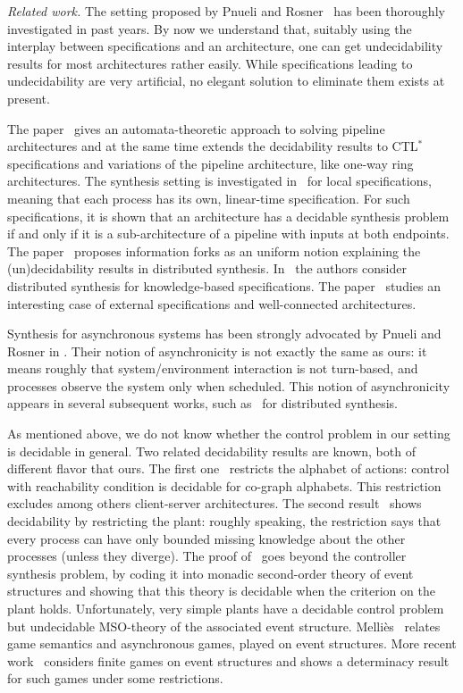 \documentclass{llncs}
\begin{document}
\noindent\textit{Related work.}
The setting proposed by Pnueli and Rosner~\cite{PR90} has been
thoroughly investigated in past years. 
By now we understand that, suitably using
the interplay 
between specifications and an architecture, one can get undecidability
results for most architectures rather easily. While
specifications leading to undecidability are very artificial, no
elegant solution to eliminate them exists at present.


The paper~\cite{kv01} gives an automata-theoretic approach to
solving pipeline architectures and at the same time extends the
decidability results to CTL$^*$ specifications and variations of the
pipeline architecture, like one-way ring architectures. The synthesis
setting is investigated in~\cite{MadThiag01} for local
specifications, meaning that each process has its own, linear-time
specification. For such specifications, it is shown that an
architecture has a decidable synthesis problem if and only if it is a
sub-architecture of a pipeline with inputs at both endpoints.
The paper~\cite{FinSch05} proposes information forks as an uniform
notion explaining the (un)decidability results in distributed
synthesis. 
In~\cite{MeyWil05} the authors consider distributed synthesis for
knowledge-based 
specifications. The paper~\cite{GasSznZei09} studies an interesting case
of external specifications and well-connected architectures.

Synthesis for asynchronous systems has been strongly advocated by Pnueli
and Rosner in \cite{PR89icalp}. Their notion of asynchronicity
is not exactly the same as ours: it means roughly that system/environment
interaction is not
turn-based, and processes observe the system only when
scheduled.
 This notion of asynchronicity appears in
several subsequent works, such as~\cite{sf06,KatSchPel11} for distributed
synthesis.


 
As mentioned above, we do not know whether the control problem in our setting is
decidable in general. Two related decidability results are known, both
of different flavor that ours. The first one~\cite{GLZ04} restricts the alphabet of actions: control with reachability
condition is decidable for co-graph alphabets.  This restriction 
excludes among others client-server architectures.
The second result~\cite{MTY05} shows decidability by restricting the
plant: roughly speaking, the restriction says that every process
can have only bounded missing knowledge about the other processes (unless
they diverge). The proof
of~\cite{MTY05} goes beyond the controller synthesis problem, by
coding it into monadic second-order theory of event structures and
showing that this theory is decidable when the criterion on the plant
holds. Unfortunately, very simple plants have a  decidable control problem but
undecidable MSO-theory of the associated event structure.
Melli\`es~\cite{mel06} relates game semantics and asynchronous games, played
on event structures.
More recent 
work~\cite{cgw12} considers finite games on event structures
and shows a determinacy result for such games under some restrictions.
\end{document}
